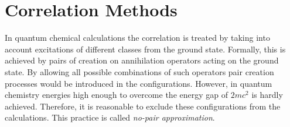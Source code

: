\section{Correlation Methods}
In quantum chemical calculations the correlation is treated by taking into
account excitations of different classes from the ground state. Formally, this is
achieved by pairs of creation on annihilation operators acting on the ground
state. By allowing all possible combinations of such operators pair creation
processes would be introduced in the configurations. However, in quantum chemistry
energies high enough to overcome the energy gap of $2mc^2$ is hardly achieved.
Therefore, it is reasonable to exclude these configurations from the calculations.
This practice is called \emph{no-pair approximation}.



